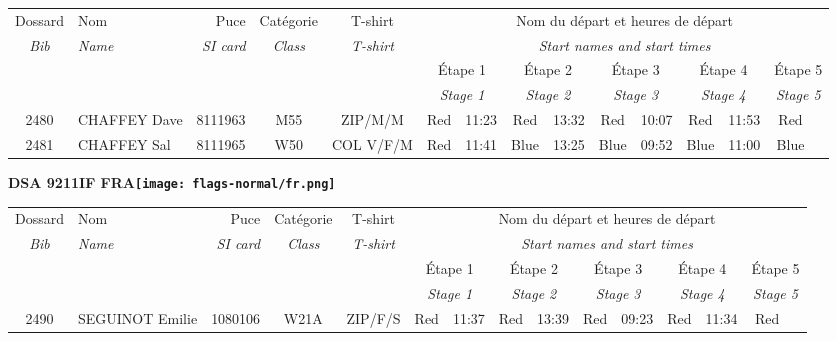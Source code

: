 \documentclass{report}
\begin{document}
  \begin{longtable}{|c|l|r|c|c|*{5}{cc|}}
    Dossard & Nom  & Puce    & Catégorie & T-shirt & \multicolumn{10}{c|}{Nom du départ et heures de départ} \\
    \itshape Bib     & \itshape Name & \itshape SI card & \itshape Class  & \itshape  T-shirt  & \multicolumn{10}{c|}{\itshape Start names and start times} \\
    \hline
    & & & & & \multicolumn{2}{c|}{Étape 1} & \multicolumn{2}{c|}{Étape 2} & \multicolumn{2}{c|}{Étape 3} & \multicolumn{2}{c|}{Étape 4} & \multicolumn{2}{c|}{Étape 5} \\
    & & & & & \multicolumn{2}{c|}{\itshape Stage 1} & \multicolumn{2}{c|}{\itshape Stage 2} & \multicolumn{2}{c|}{\itshape Stage 3} & \multicolumn{2}{c|}{\itshape Stage 4} & \multicolumn{2}{c|}{\itshape Stage 5} \\
    \hline
    2480 & CHAFFEY Dave & 8111963 & M55 & ZIP/M/M & Red & 11:23 & Red & 13:32 & Red & 10:07 & Red & 11:53 & Red &  \\
    2481 & CHAFFEY Sal & 8111965 & W50 & COL V/F/M & Red & 11:41 & Blue & 13:25 & Blue & 09:52 & Blue & 11:00 & Blue &  \\
  \end{longtable}
\newpage
  \Huge \centering \bfseries DSA 9211IF FRA\normalfont \footnotesize \sffamily \hfill \texttt{[image: flags-normal/fr.png]} \newline 
  \begin{longtable}{|c|l|r|c|c|*{5}{cc|}}
    Dossard & Nom  & Puce    & Catégorie & T-shirt & \multicolumn{10}{c|}{Nom du départ et heures de départ} \\
    \itshape Bib     & \itshape Name & \itshape SI card & \itshape Class  & \itshape  T-shirt  & \multicolumn{10}{c|}{\itshape Start names and start times} \\
    \hline
    & & & & & \multicolumn{2}{c|}{Étape 1} & \multicolumn{2}{c|}{Étape 2} & \multicolumn{2}{c|}{Étape 3} & \multicolumn{2}{c|}{Étape 4} & \multicolumn{2}{c|}{Étape 5} \\
    & & & & & \multicolumn{2}{c|}{\itshape Stage 1} & \multicolumn{2}{c|}{\itshape Stage 2} & \multicolumn{2}{c|}{\itshape Stage 3} & \multicolumn{2}{c|}{\itshape Stage 4} & \multicolumn{2}{c|}{\itshape Stage 5} \\
    \hline
    2490 & SEGUINOT Emilie & 1080106 & W21A & ZIP/F/S & Red & 11:37 & Red & 13:39 & Red & 09:23 & Red & 11:34 & Red &  \\
  \end{longtable}
\end{document}
